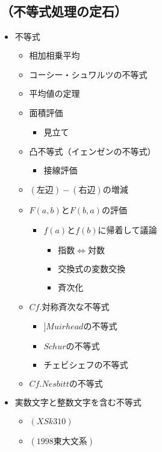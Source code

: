 \documentclass[dvipdfmx,uplatex]{jsarticle}
\begin{document}
\subsection{（不等式処理の定石）}
\begin{itemize}
	\item $ 不等式$
	\begin{itemize}
		\item $ 相加相乗平均$
		\item $ コーシー・シュワルツの不等式$
		\item $ 平均値の定理$
		\item $ 面積評価$
		\begin{itemize}
			\item $ 見立て$
		\end{itemize}
		\item $ 凸不等式（イェンゼンの不等式）$
		\begin{itemize}
			\item $ 接線評価$
		\end{itemize}
		\item $ (左辺) - (右辺) の増減$
		\item $ F(a,b) と F(b,a)の評価$
		\begin{itemize}
			\item $ f(a) と f(b)に帰着して議論$
			\begin{itemize}
				\item $ 指数⇔対数$
				\item $ 交換式の変数交換$
				\item $ 斉次化$
			\end{itemize}
		\end{itemize}
		\item $ Cf. 対称斉次な不等式$
		\begin{itemize}
			\item $ ]Muirheadの不等式$
			\item $ Schurの不等式$
			\item $ チェビシェフの不等式$
		\end{itemize}
		\item $ Cf. Nesbittの不等式$
	\end{itemize}
	\item $ 実数文字と整数文字を含む不等式$
	\begin{itemize}
		\item $  (XSk310)$
		\item $ (1998 東大文系)$
	\end{itemize}
\end{itemize}
\end{document}
